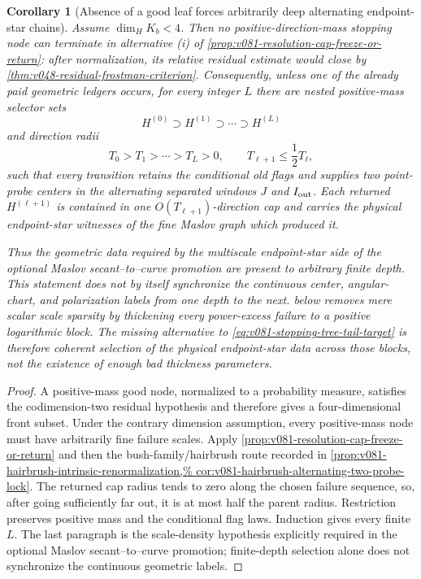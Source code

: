 \documentclass[10pt]{article}
\newtheorem{corollary}[theorem]{Corollary}
\begin{document}
\begin{corollary}[Absence of a good leaf forces arbitrarily deep alternating endpoint-star chains]
\label{cor:v081-no-good-leaf-endpoint-chain}
Assume \(\dim_HK_b<4\).  Then no positive-direction-mass stopping node can terminate in
alternative \textnormal{(i)} of
\cref{prop:v081-resolution-cap-freeze-or-return}: after normalization, its relative residual
estimate would close by
\cref{thm:v048-residual-frostman-criterion}.  Consequently, unless one of the already paid
geometric ledgers occurs, for every integer \(L\) there are nested positive-mass selector sets
\[
H^{(0)}\supset H^{(1)}\supset\cdots\supset H^{(L)}
\]
and direction radii
\[
T_0>T_1>\cdots>T_L>0,
\qquad
T_{\ell+1}\le\frac12T_\ell,
\]
such that every transition retains the conditional old flags and supplies two point-probe centers
in the alternating separated windows \(J\) and \(I_{\rm out}\).  Each returned
\(H^{(\ell+1)}\) is contained in one \(O(T_{\ell+1})\)-direction cap and carries the physical
endpoint-star witnesses of the fine Maslov graph which produced it.

Thus the geometric data required by the multiscale endpoint-star side of
the optional Maslov secant--to--curve promotion are present to arbitrary finite depth.  This statement does
\emph{not} by itself synchronize the continuous center, angular-chart, and polarization labels
from one depth to the next.   below removes
mere scalar scale sparsity by thickening every power-excess failure to a positive logarithmic
block.  The missing alternative to
\eqref{eq:v081-stopping-tree-tail-target} is therefore coherent selection of the physical
endpoint-star data across those blocks, not the existence of enough bad thickness parameters.
\end{corollary}

\begin{proof}
A positive-mass good node, normalized to a probability measure, satisfies the codimension-two
residual hypothesis and therefore gives a four-dimensional front subset.  Under the contrary
dimension assumption, every positive-mass node must have arbitrarily fine failure scales.  Apply
\cref{prop:v081-resolution-cap-freeze-or-return} and then the bush-family/hairbrush route recorded
in
\cref{prop:v081-hairbrush-intrinsic-renormalization,%
cor:v081-hairbrush-alternating-two-probe-lock}.  The returned cap radius tends to zero along the
chosen failure sequence, so, after going sufficiently far out, it is at most half the parent
radius.  Restriction preserves positive mass and the conditional flag laws.  Induction gives every
finite \(L\).  The last paragraph is the scale-density hypothesis explicitly required in
the optional Maslov secant--to--curve promotion; finite-depth selection alone does not synchronize the
continuous geometric labels.
\end{proof}
\end{document}
